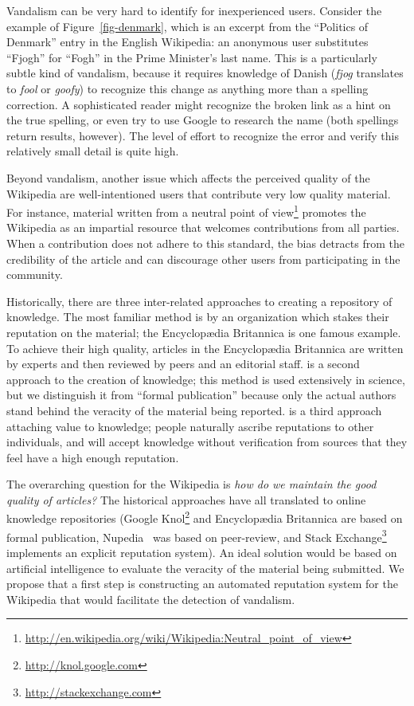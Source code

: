Vandalism can be very hard to identify for inexperienced users.
Consider the example of Figure~\ref{fig-denmark},
which is an excerpt from the ``Politics of Denmark''
entry in the English Wikipedia: an anonymous user substitutes
``Fjogh'' for ``Fogh'' in the Prime Minister's last name.
This is a particularly subtle kind of vandalism,
because it requires knowledge of Danish
(\textit{fjog} translates to \textit{fool} or \textit{goofy})
to recognize this change as anything more than a spelling correction.
A sophisticated reader might recognize the broken link
as a hint on the true spelling, or even try to use Google
to research the name (both spellings return results, however).
The level of effort to recognize the error and
verify this relatively small detail is quite high.

Beyond vandalism, another issue which affects the perceived
quality of the Wikipedia are well-intentioned users that contribute
very low quality material.
For instance, material written from a
neutral point of view\footnote{\url{http://en.wikipedia.org/wiki/Wikipedia:Neutral_point_of_view}}
promotes the Wikipedia as an impartial resource that welcomes contributions
from all parties.
When a contribution does not adhere to this standard, the bias
detracts from the credibility of the article and can discourage
other users from participating in the community.

Historically, there are three inter-related approaches to
creating a repository of knowledge.
The most familiar method is  by an organization
which stakes their reputation on the material;
the Encyclop{\ae}dia Britannica is one famous example.
To achieve their high quality, articles in the
Encyclop{\ae}dia Britannica are written by experts
and then reviewed by peers and an editorial staff.
 is a second approach to the creation of
knowledge; this method is used extensively in science,
but we distinguish it from ``formal publication'' because
only the actual authors stand behind the veracity of the
material being reported.
 is a third approach attaching value
to knowledge; people naturally ascribe reputations to other
individuals, and will accept knowledge without verification from
sources that they feel have a high enough reputation.

The overarching question for the Wikipedia is
\textit{how do we maintain the good quality of articles?}
The historical approaches have all translated to online
knowledge repositories (\eg Google Knol\footnote{\url{http://knol.google.com}}
and Encyclop{\ae}dia Britannica
are based on formal publication,
Nupedia~\cite{wiki:Nupedia}
was based on peer-review,
and Stack Exchange\footnote{\url{http://stackexchange.com}}
implements an explicit reputation system).
An ideal solution would be based on artificial intelligence to
evaluate the veracity of the material being submitted.
We propose that a first step is constructing an automated reputation system
for the Wikipedia that would facilitate the
detection of vandalism.

